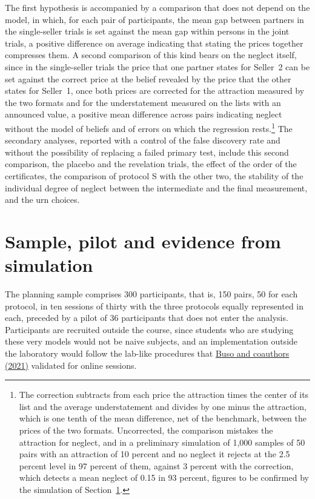 \documentclass[11pt,a4paper]{article}
\newcommand{\cy}[2]{\hyperlink{cite.#1}{\textcolor{citecolor}{#2}}}
\newcommand{\prot}[1]{\textsf{#1}}
\begin{document}
The first hypothesis is accompanied by a comparison that does not depend on the model, in which, for each pair of participants, the mean gap between partners in the single-seller trials is set against the mean gap within persons in the joint trials, a positive difference on average indicating that stating the prices together compresses them. A second comparison of this kind bears on the neglect itself, since in the single-seller trials the price that one partner states for Seller~2 can be set against the correct price at the belief revealed by the price that the other states for Seller~1, once both prices are corrected for the attraction measured by the two formats and for the understatement measured on the lists with an announced value, a positive mean difference across pairs indicating neglect without the model of beliefs and of errors on which the regression rests.\footnote{The correction subtracts from each price the attraction times the center of its list and the average understatement and divides by one minus the attraction, which is one tenth of the mean difference, net of the benchmark, between the prices of the two formats. Uncorrected, the comparison mistakes the attraction for neglect, and in a preliminary simulation of 1,000 samples of 50 pairs with an attraction of 10 percent and no neglect it rejects at the 2.5 percent level in 97 percent of them, against 3 percent with the correction, which detects a mean neglect of 0.15 in 93 percent, figures to be confirmed by the simulation of Section~\ref{sec:sample}.} The secondary analyses, reported with a control of the false discovery rate and without the possibility of replacing a failed primary test, include this second comparison, the placebo and the revelation trials, the effect of the order of the certificates, the comparison of protocol \prot{S} with the other two, the stability of the individual degree of neglect between the intermediate and the final measurement, and the urn choices.

\section{Sample, pilot and evidence from simulation}\label{sec:sample}

The planning sample comprises 300 participants, that is, 150 pairs, 50 for each protocol, in ten sessions of thirty with the three protocols equally represented in each, preceded by a pilot of 36 participants that does not enter the analysis. Participants are recruited outside the course, since students who are studying these very models would not be naive subjects, and an implementation outside the laboratory would follow the lab-like procedures that \cy{buso}{Buso and coauthors (2021)} validated for online sessions.
\end{document}
